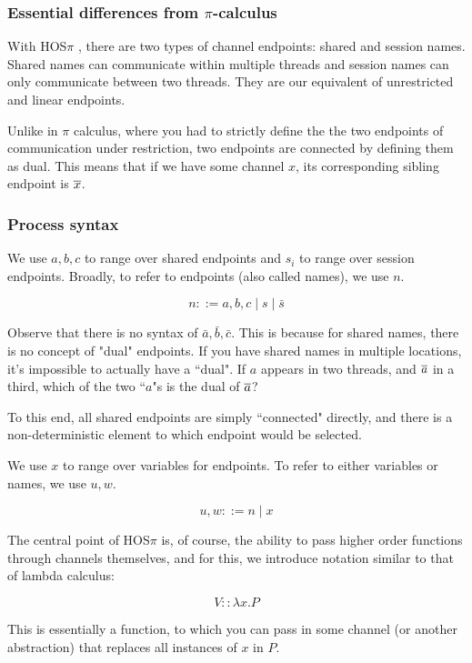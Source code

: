 \subsubsection{Essential differences from $\pi$-calculus}

With HOS$\pi$ , there are two types of channel endpoints: shared and session names. Shared names can communicate within multiple threads and session names can only communicate between two threads. They are our equivalent of unrestricted and linear endpoints.

Unlike in $\pi$ calculus, where you had to strictly define the the two endpoints of communication under restriction, two endpoints are connected by defining them as dual. This means that if we have some channel $x$, its corresponding sibling endpoint is $\overline{x}$.


\subsubsection{Process syntax}

We use $a,b,c$ to range over shared endpoints and $s_i$ to range over session endpoints. Broadly, to refer to endpoints (also called names), we use $n$.

$$
n ::= a,b,c \mid s \mid \bar{s}
$$

Observe that there is no syntax of $\bar{a}, \bar{b}, \bar{c}$. This is because for shared names, there is no concept of "dual" endpoints. If you have shared names in multiple locations, it's impossible to actually have a ``dual". If $a$ appears in two threads, and $\overline{a}$ in a third, which of the two ``$a$"s is the dual of $\overline{a}$?

To this end, all shared endpoints are simply ``connected" directly, and there is a non-deterministic element to which endpoint would be selected.

We use $x$ to range over variables for endpoints. To refer to either variables or names, we use $u,w$.

$$
u,w ::= n \mid x
$$

The central point of HOS$\pi$ is, of course, the ability to pass higher order functions through channels themselves, and for this, we introduce notation similar to that of lambda calculus:

$$
V :: \lambda x.  P
$$

This is essentially a function, to which you can pass in some channel (or another abstraction) that replaces all instances of $x$ in $P$. 


